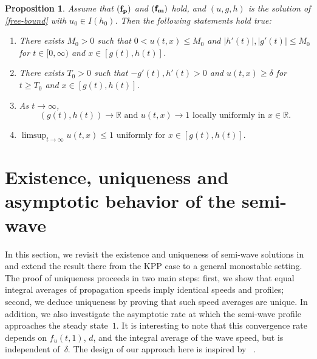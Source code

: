 \documentclass[11pt]{amsart}
\newtheorem{proposition}[theorem]{Proposition}
\numberwithin{equation}{section}
\begin{document}
 \begin{proposition}{\rm\cite{MDW}}\label{prop-summ}
  Assume that  $\rm{(\bf{f_p})}$ and   $\rm{(\bf{f_m})}$ hold, and   $(u,g,h)$ is the solution of \eqref{free-bound} with $u_0\in I(h_0)$. Then the following statements hold true:
  \begin{enumerate}[{\rm(i)}]
    \item There exists $M_0>0$ such that $0<u(t,x)\leq M_0$ and $|h'(t)|,|g'(t)|\leq M_0$ for $t\in[0,\infty)$ and $x\in[g(t),h(t)]$.
    \item There exists $T_0>0$ such that $-g'(t),h'(t)>0$ and $u(t,x)\geq \delta$ for $t\geq T_0$ and $x\in[g(t),h(t)]$.
    \item  As $t\to\infty$, 
    \begin{equation*}
     (g(t),h(t))\to\mathbb R \text{ and }u(t,x)\to 1 \text{ locally uniformly in } x\in\mathbb{R}.
        \end{equation*}
         \item $\limsup_{t\to\infty} u(t,x)\leq 1 \mbox{ uniformly for } x\in [g(t), h(t)].$
  \end{enumerate}
 \end{proposition}
 
 

 
 
  
\section{Existence, uniqueness and asymptotic behavior of the semi-wave}

In this section, we revisit the existence and uniqueness of semi-wave solutions in \cite{MDW} and extend the result there from the KPP case to a general monostable setting. The proof of uniqueness proceeds in two main steps: first, we show that equal integral averages of propagation speeds imply identical speeds and profiles; second, we deduce uniqueness by proving that such speed averages  are unique. In addition, we also investigate the asymptotic rate at which the semi-wave profile approaches the steady state~$1$. It is interesting to note that this convergence rate depends on $f_u(t,1)$, $d$, and the integral average of the wave speed, but is independent of~$\delta$. The design of our approach here is inspired by ~\cite{ABC,DGP}.
\end{document}
